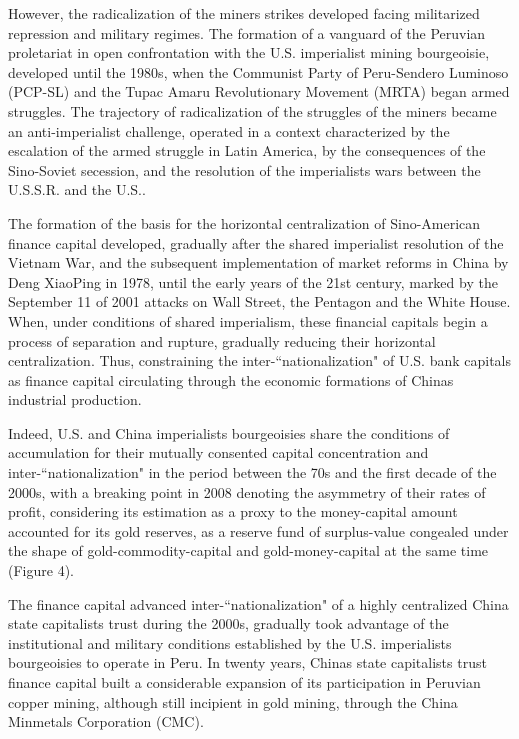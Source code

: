 \documentclass[
]{article}
\begin{document}
However, the radicalization of the miners\textquotesingle{} strikes
developed facing militarized repression and military regimes. The
formation of a vanguard of the Peruvian proletariat in open
confrontation with the U.S. imperialist mining bourgeoisie, developed
until the 1980s, when the Communist Party of Peru-Sendero Luminoso
(PCP-SL) and the Tupac Amaru Revolutionary Movement (MRTA) began armed
struggles. The trajectory of radicalization of the struggles of the
miners became an anti-imperialist challenge, operated in a context
characterized by the escalation of the armed struggle in Latin America,
by the consequences of the Sino-Soviet secession, and the resolution of
the imperialists wars between the U.S.S.R. and the U.S..

The formation of the basis for the horizontal centralization of
Sino-American finance capital developed, gradually after the shared
imperialist resolution of the Vietnam War, and the subsequent
implementation of market reforms in China by Deng XiaoPing in 1978,
until the early years of the 21st century, marked by the September 11 of
2001 attacks on Wall Street, the Pentagon and the White House. When,
under conditions of shared imperialism, these financial capitals begin a
process of separation and rupture, gradually reducing their horizontal
centralization. Thus, constraining the inter-``nationalization" of U.S.
bank capitals as finance capital circulating through the economic
formations of China\textquotesingle s industrial production.

Indeed, U.S. and China imperialists bourgeoisies share the conditions of
accumulation for their mutually consented capital concentration and
inter-``nationalization" in the period between the 70s and the first
decade of the 2000s, with a breaking point in 2008 denoting the
asymmetry of their rates of profit, considering its estimation as a
proxy to the money-capital amount accounted for its gold reserves, as a
reserve fund of surplus-value congealed under the shape of
gold-commodity-capital and gold-money-capital at the same time (Figure
4).

The finance capital advanced inter-``nationalization" of a highly
centralized China state capitalists trust during the 2000s, gradually
took advantage of the institutional and military conditions established
by the U.S. imperialists bourgeoisies to operate in Peru. In twenty
years, China\textquotesingle s state capitalists trust finance capital
built a considerable expansion of its participation in Peruvian copper
mining, although still incipient in gold mining, through the China
Minmetals Corporation (CMC).
\end{document}
